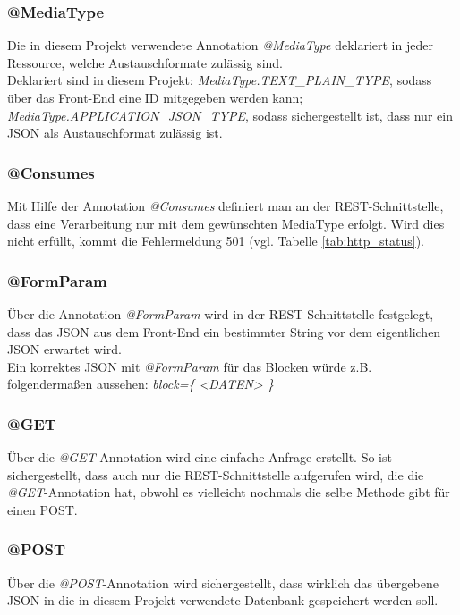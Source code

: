 \subsubsection*{@MediaType}
\label{sss:mediatype}
Die in diesem Projekt verwendete Annotation \textit{@MediaType} deklariert in jeder Ressource, welche Austauschformate zulässig sind. \\
Deklariert sind in diesem Projekt: \textit{MediaType.TEXT\_PLAIN\_TYPE}, sodass über das Front-End eine ID mitgegeben werden kann; \textit{MediaType.APPLICATION\_JSON\_TYPE}, sodass sichergestellt ist, dass nur ein \acs{JSON} als Austauschformat zulässig ist.

\subsubsection*{@Consumes}
\label{sss:consumes}
Mit Hilfe der Annotation \textit{@Consumes} definiert man an der \acs{REST}-Schnittstelle, dass eine Verarbeitung nur mit dem gewünschten MediaType erfolgt.
Wird dies nicht erfüllt, kommt die Fehlermeldung 501 (vgl. Tabelle \vref{tab:http_status}).

\subsubsection*{@FormParam}
\label{sss:formparam}
Über die Annotation \textit{@FormParam} wird in der \acs{REST}-Schnittstelle festgelegt, dass das \acs{JSON} aus dem Front-End ein bestimmter String vor dem eigentlichen \acs{JSON} erwartet wird. \\
Ein korrektes \acs{JSON} mit \textit{@FormParam} für das Blocken würde z.B. folgendermaßen aussehen: \textit{block=\{ <DATEN> \}}
\subsubsection*{@GET}
\label{sss:get}
Über die \textit{@GET}-Annotation wird eine einfache Anfrage erstellt.
So ist sichergestellt, dass auch nur die \acs{REST}-Schnittstelle aufgerufen wird, die die \textit{@GET}-Annotation hat, obwohl es vielleicht nochmals die selbe Methode gibt für einen POST.

\subsubsection*{@POST}
\label{sss:post}
Über die \textit{@POST}-Annotation wird sichergestellt, dass wirklich das übergebene \acs{JSON} in die in diesem Projekt verwendete Datenbank gespeichert werden soll.

